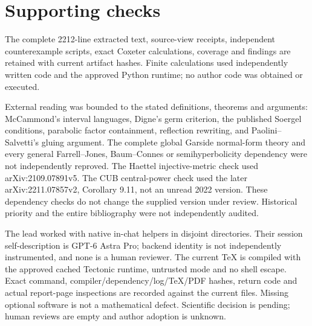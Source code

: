 \documentclass[10pt]{article}
\begin{document}
\section*{Supporting checks}
The complete 2212-line extracted text, source-view receipts, independent counterexample scripts, exact Coxeter calculations, coverage and findings are retained with current artifact hashes. Finite calculations used independently written code and the approved Python runtime; no author code was obtained or executed.\par
External reading was bounded to the stated definitions, theorems and arguments: McCammond’s interval languages, Digne’s germ criterion, the published Soergel conditions, parabolic factor containment, reflection rewriting, and Paolini–Salvetti’s gluing argument. The complete global Garside normal-form theory and every general Farrell–Jones, Baum–Connes or semihyperbolicity dependency were not independently reproved. The Haettel injective-metric check used arXiv:2109.07891v5. The CUB central-power check used the later arXiv:2211.07857v2, Corollary 9.11, not an unread 2022 version. These dependency checks do not change the supplied version under review. Historical priority and the entire bibliography were not independently audited.\par
The lead worked with native in-chat helpers in disjoint directories. Their session self-description is GPT-6 Astra Pro; backend identity is not independently instrumented, and none is a human reviewer. The current TeX is compiled with the approved cached Tectonic runtime, untrusted mode and no shell escape. Exact command, compiler/dependency/log/TeX/PDF hashes, return code and actual report-page inspections are recorded against the current files. Missing optional software is not a mathematical defect. Scientific decision is pending; human reviews are empty and author adoption is unknown.\par
\end{document}
